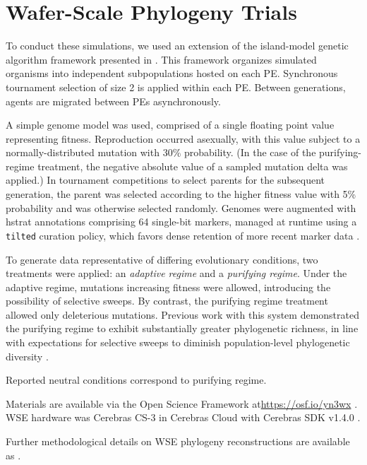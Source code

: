 \section{Wafer-Scale Phylogeny Trials}


To conduct these simulations, we used an extension of the island-model genetic algorithm framework presented in \cite{moreno2024trackable}.
This framework organizes simulated organisms into independent subpopulations hosted on each PE.
Synchronous tournament selection of size 2 is applied within each PE.
Between generations, agents are migrated between PEs asynchronously.


A simple genome model was used, comprised of a single floating point value representing fitness.
Reproduction occurred asexually, with this value subject to a normally-distributed mutation with 30\% probability.
(In the case of the purifying-regime treatment, the negative absolute value of a sampled mutation delta was applied.)
In tournament competitions to select parents for the subsequent generation, the parent was selected according to the higher fitness value with 5\% probability and was otherwise selected randomly.
Genomes were augmented with hstrat annotations comprising 64 single-bit markers, managed at runtime using a \texttt{tilted} curation policy, which favors dense retention of more recent marker data \cite{moreno2024algorithms}.

To generate data representative of differing evolutionary conditions, two treatments were applied: an \textit{adaptive regime} and a \textit{purifying regime}.
Under the adaptive regime, mutations increasing fitness were allowed, introducing the possibility of selective sweeps.
By contrast, the purifying regime treatment allowed only deleterious mutations.
Previous work with this system demonstrated the purifying regime to exhibit substantially greater phylogenetic richness, in line with expectations for selective sweeps to diminish population-level phylogenetic diversity \cite{moreno2024trackable}.

Reported neutral conditions correspond to purifying regime.

Materials are available via the Open Science Framework at\url{https://osf.io/yn3wx} \cite{foster2017open}.
WSE hardware was Cerebras CS-3 in Cerebras Cloud with Cerebras SDK v1.4.0 \cite{buitrago2021neocortex}.

Further methodological details on WSE phylogeny reconstructions are available as \cite{singhvi2025scalable}.
